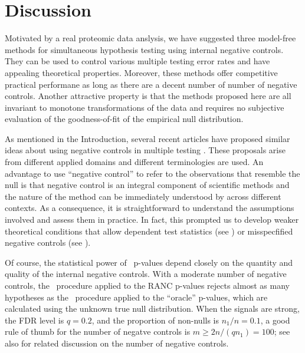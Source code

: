 \documentclass[a4paper,11pt]{article}
\theoremstyle{plain}
\theoremstyle{definition}
\theoremstyle{plain}
\newcommand{\No}{{n}}
\newcommand{\NoNonNull}{{n_1}}
\newcommand{\NoNc}{m}
\newcommand{\nickname}{{\text{RANC}}}
\newcommand{\FDRLevel}{q}
\newcommand{\BH}{{\text{BH}}}
\begin{document}
\section{Discussion}\label{sec:discussion}

Motivated by a real proteomic data anslysis, we have suggested three
model-free methods for simultaneous hypothesis testing using
internal negative controls. They can be used to control various
multiple testing error rates and have appealing theoretical
properties. Moreover, these methods offer competitive practical
performane as long as there are a decent number of number of negative
controls. Another attractive property is that the methods proposed
here are all invariant to monotone transformations of the data and
requires no subjective evaluation of the goodness-of-fit of the
empirical null distribution.

As mentioned in the Introduction, several recent articles have proposed
similar ideas about using negative controls in multiple testing
\parencite{bates21_testin_outlier_with_confor_p_values,mary22_semi_super_multip_testin,soloff22_edge_discov}. These
proposals arise from different applied domains and different
terminologies are used. An advantage to use ``negative control'' to
refer to the observations that resemble the null is that negative
control is an integral component of scientific methods and the nature
of the method can be immediately understood by across different
contexts. As a consequence, it is straightforward to understand the
assumptions involved and assess them in practice. In fact, this
prompted us to develop weaker theoretical conditions that allow
dependent test statistics (see ) or
misspecfified negative controls (see ).

Of course, the statistical power of \nickname~p-values depend closely on
the quantity and quality of the internal negative controls. With a
moderate number of negative controls, the \BH~procedure
applied to the RANC p-values rejects almost as many hypotheses as the
\BH~procedure applied to the ``oracle'' p-values, which are calculated
using the unknown true null
distribution. When the signals are strong, the FDR level is $q = 0.2$,
and
the proportion of non-nulls is $n_1/n = 0.1$, a good rule of thumb
for the number of negatve controls is $\NoNc \ge 2 \No/(\FDRLevel
\NoNonNull) = 100$; see also
\textcite{mary22_semi_super_multip_testin} for related discussion on the
number of negative controls.
\end{document}

